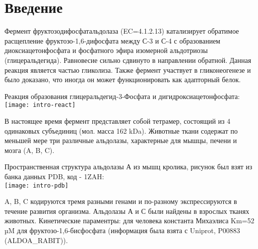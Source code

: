 \section{Введение}
Фермент фруктозодифосфатальдолаза (EC=4.1.2.13) катализирует обратимое расщепление
фруктозо-1,6-дифосфата между С-3 и С-4 с образованием диоксиацетонфосфата и фосфатного эфира
изомерной альдотриозы (глицеральдегида). Равновесие сильно сдвинуто в направлении
обратной. Данная реакция является частью гликолиза. Также фермент участвует в гликонеогенезе и
было доказано, что иногда он может функционировать как адапторный белок.

Реакция образования глицеральдегид-3-Фосфата и дигидроксиацетонфосфата:\\
\texttt{[image: intro-react]}

В настоящее время фермент представляет собой тетрамер, состоящий из 4 одинаковых субъединиц (мол.
масса 162 kDa). Животные ткани содержат по меньшей мере три различные альдолазы, характерные для
мышцы, печени и мозга (A, B, C).

Пространственная структура альдолазы А из мышц кролика, рисунок был взят из банка данных PDB, код - 1ZAH:\\
\texttt{[image: intro-pdb]}

A, B, C кодируются тремя разными генами и по-разному экспрессируются в течение развития организма.
Альдолазы А и С были найдены в взрослых тканях животных.
Кинетические параментры: для человека константа Михаэлиса Km=52 µM  для фруктозо-1,6-бисфосфата
(информация была взята с Uniprot, P00883 (ALDOA\_RABIT)).

